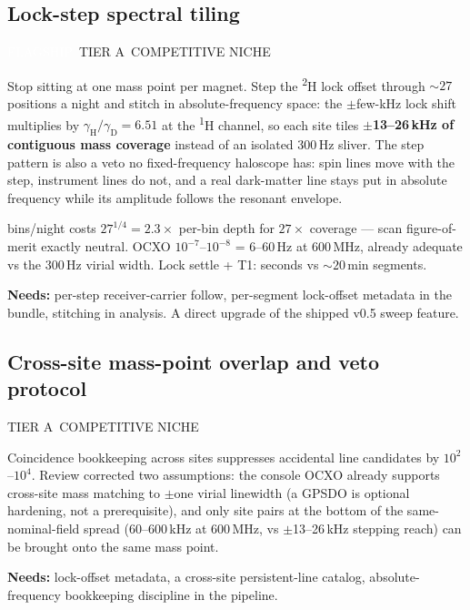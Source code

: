 \documentclass[11pt]{article}
\newcommand{\chip}[3]{\colorbox{#1}{\textcolor{#2}{\scriptsize\textsf{\vphantom{Ag}#3}}}}
\newcommand{\cflag}[1]{\chip{accent}{white}{#1}}
\newcommand{\cniche}[1]{\chip{accentsoft}{accentink}{#1}}
\newcommand{\ctier}[1]{\chip{numbg}{inkfaint}{#1}}
\newcommand{\needs}[1]{{\small\textcolor{inkfaint}{\textbf{Needs:} #1}}}
\newcommand{\hnmr}{\textsuperscript{1}H}
\newcommand{\dnmr}{\textsuperscript{2}H}
\begin{document}
\subsection{Lock-step spectral tiling}
\cflag{FLAGSHIP}\ \ctier{TIER A}\ \cniche{COMPETITIVE NICHE}

\medskip\noindent
Stop sitting at one mass point per magnet. Step the \dnmr{} lock offset through
${\sim}27$ positions a night and stitch in absolute-frequency space: the
$\pm$few-kHz lock shift multiplies by $\gamma_{\mathrm H}/\gamma_{\mathrm D} = 6.51$
at the \hnmr{} channel, so each site tiles \textbf{$\pm$13--26\,kHz of contiguous
mass coverage} instead of an isolated 300\,Hz sliver. The step pattern is also a
veto no fixed-frequency haloscope has: spin lines move with the step, instrument
lines do not, and a real dark-matter line stays put in absolute frequency while
its amplitude follows the resonant envelope.

\begin{numbers}\small{} bins/night costs $27^{1/4}=2.3\times$ per-bin depth for $27\times$ coverage ---
scan figure-of-merit exactly neutral. OCXO $10^{-7}$--$10^{-8}$ = 6--60\,Hz at
600\,MHz, already adequate vs the 300\,Hz virial width. Lock settle + T1:
seconds vs ${\sim}20$\,min segments.
\end{numbers}

\needs{per-step receiver-carrier follow, per-segment lock-offset metadata in the
bundle, stitching in analysis. A direct upgrade of the shipped v0.5 sweep feature.}

\subsection{Cross-site mass-point overlap and veto protocol}
\ctier{TIER A}\ \cniche{COMPETITIVE NICHE}

\medskip\noindent
Coincidence bookkeeping across sites suppresses accidental line candidates by
$10^{2}$--$10^{4}$. Review corrected two assumptions: the console OCXO already
supports cross-site mass matching to $\pm$one virial linewidth (a GPSDO is
optional hardening, not a prerequisite), and only site pairs at the bottom of the
same-nominal-field spread (60--600\,kHz at 600\,MHz, vs $\pm$13--26\,kHz stepping
reach) can be brought onto the same mass point.

\smallskip
\needs{lock-offset metadata, a cross-site persistent-line catalog,
absolute-frequency bookkeeping discipline in the pipeline.}

\end{document}
